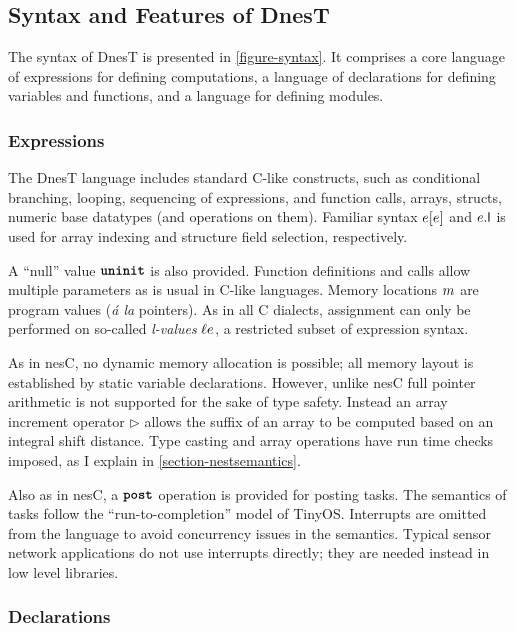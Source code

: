 \subsection{Syntax and Features of DnesT}

The syntax of DnesT is presented in \autoref{figure-syntax}. It comprises a core language of
expressions for defining computations, a language of declarations for defining variables and
functions, and a language for defining modules.

\syntaxfig

\subsubsection{Expressions}

The DnesT language includes standard C-like constructs, such as conditional branching, looping,
sequencing of expressions, and function calls, arrays, structs, numeric base datatypes (and
operations on them). Familiar syntax $e [e]$ and $e.\textsf{l}$ is used for array indexing and
structure field selection, respectively.

A ``null'' value $\mbox{\bf \texttt{uninit}}$ is also provided. Function definitions and calls allow multiple
parameters as is usual in C-like languages. Memory locations $m$ are program values
(\emph{\'a la} pointers). As in all C dialects, assignment can only be performed on so-called
\emph{l-values} $\ell e$, a restricted subset of expression syntax.

As in nesC, no dynamic memory allocation is possible; all memory layout is established by static
variable declarations. However, unlike nesC full pointer arithmetic is not supported for the
sake of type safety. Instead an array increment operator $\rhd$ allows the suffix of an array to
be computed based on an integral shift distance. Type casting and array operations have run time
checks imposed, as I explain in \autoref{section-nestsemantics}.

Also as in nesC, a $\mbox{\bf \texttt{post}}$ operation is provided for posting tasks. The semantics of tasks
follow the ``run-to-completion'' model of TinyOS. Interrupts are omitted from the language to
avoid concurrency issues in the semantics. Typical sensor network applications do not use
interrupts directly; they are needed instead in low level libraries.

\subsubsection{Declarations}

